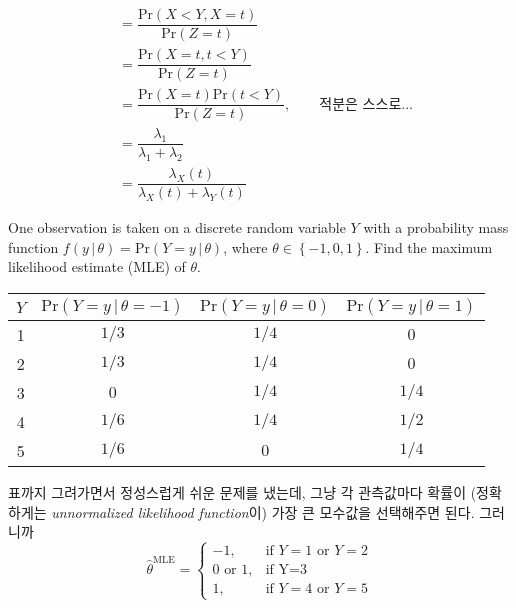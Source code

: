 \documentclass[answers]{exam}
\begin{document}
\begin{questions}
\begin{solution}
\begin{enumerate}[(a)]
\begin{align}
        &=\dfrac{\mathrm{Pr}\left(X<Y,X=t\right)}{\mathrm{Pr}\left(Z=t\right)}\\
        &=\dfrac{\mathrm{Pr}\left(X=t,t<Y\right)}{\mathrm{Pr}\left(Z=t\right)}\\
        &=\dfrac{\mathrm{Pr}\left(X=t\right)\mathrm{Pr}\left(t<Y\right)}{\mathrm{Pr}\left(Z=t\right)},\qquad \text{적분은 스스로...}\\
        &=\dfrac{\lambda_{1}}{\lambda_{1}+\lambda_{2}}\\
        &=\dfrac{\lambda_{X}\left(t\right)}{\lambda_{X}\left(t\right)+\lambda_{Y}\left(t\right)}
      \end{align}
    \end{enumerate}
   \end{solution}
   \question
   One observation is taken on a discrete random variable $Y$ with a probability mass function $f\left(y\,|\,\theta\right) = \mathrm{Pr}\left(Y=y\,|\,\theta\right)$, where $\theta\in\left\{-1,0,1\right\}$. Find the maximum likelihood estimate (MLE) of $\theta$.
   \begin{table}[!htbp]
    \centering
      \begin{tabular}{*4c}
        \toprule
        $Y$ & $\mathrm{Pr}\left(Y=y\,|\,\theta=-1\right)$ & $\mathrm{Pr}\left(Y=y\,|\,\theta=0\right)$ & $\mathrm{Pr}\left(Y=y\,|\,\theta=1\right)$\\
        \toprule
        1 & $1/3$ & $1/4$ & $0$ \\
        \midrule
        2 & $1/3$ & $1/4$ & $0$ \\
        \midrule
        3 & $0$ & $1/4$ & $1/4$ \\
        \midrule
        4 & $1/6$ & $1/4$ & $1/2$ \\
        \midrule
        5 & $1/6$ & $0$ & $1/4$\\ 
        \bottomrule
      \end{tabular}
    \end{table}
    \begin{solution}
      표까지 그려가면서 정성스럽게 쉬운 문제를 냈는데, 그냥 각 관측값마다 확률이 (정확하게는 \emph{unnormalized likelihood function}이) 가장 큰 모수값을 선택해주면 된다. 그러니까
      \begin{equation} 
        \widehat{\theta}^{\text{MLE}}=\begin{cases}-1,& \text{if $Y=1$ or $Y=2$}\\0\text{ or }1,& \text{if Y=3}\\ 1,& \text{if $Y=4$ or $Y=5$} \end{cases}

\end{equation}
\end{solution}
\end{questions}
\end{document}
